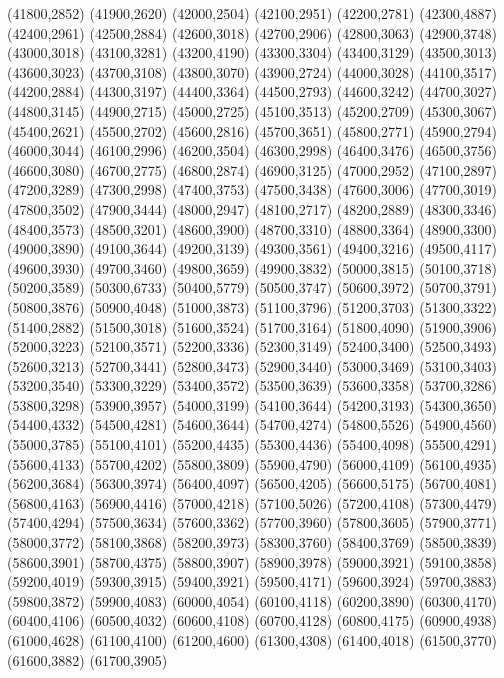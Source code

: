 (41800,2852)
(41900,2620)
(42000,2504)
(42100,2951)
(42200,2781)
(42300,4887)
(42400,2961)
(42500,2884)
(42600,3018)
(42700,2906)
(42800,3063)
(42900,3748)
(43000,3018)
(43100,3281)
(43200,4190)
(43300,3304)
(43400,3129)
(43500,3013)
(43600,3023)
(43700,3108)
(43800,3070)
(43900,2724)
(44000,3028)
(44100,3517)
(44200,2884)
(44300,3197)
(44400,3364)
(44500,2793)
(44600,3242)
(44700,3027)
(44800,3145)
(44900,2715)
(45000,2725)
(45100,3513)
(45200,2709)
(45300,3067)
(45400,2621)
(45500,2702)
(45600,2816)
(45700,3651)
(45800,2771)
(45900,2794)
(46000,3044)
(46100,2996)
(46200,3504)
(46300,2998)
(46400,3476)
(46500,3756)
(46600,3080)
(46700,2775)
(46800,2874)
(46900,3125)
(47000,2952)
(47100,2897)
(47200,3289)
(47300,2998)
(47400,3753)
(47500,3438)
(47600,3006)
(47700,3019)
(47800,3502)
(47900,3444)
(48000,2947)
(48100,2717)
(48200,2889)
(48300,3346)
(48400,3573)
(48500,3201)
(48600,3900)
(48700,3310)
(48800,3364)
(48900,3300)
(49000,3890)
(49100,3644)
(49200,3139)
(49300,3561)
(49400,3216)
(49500,4117)
(49600,3930)
(49700,3460)
(49800,3659)
(49900,3832)
(50000,3815)
(50100,3718)
(50200,3589)
(50300,6733)
(50400,5779)
(50500,3747)
(50600,3972)
(50700,3791)
(50800,3876)
(50900,4048)
(51000,3873)
(51100,3796)
(51200,3703)
(51300,3322)
(51400,2882)
(51500,3018)
(51600,3524)
(51700,3164)
(51800,4090)
(51900,3906)
(52000,3223)
(52100,3571)
(52200,3336)
(52300,3149)
(52400,3400)
(52500,3493)
(52600,3213)
(52700,3441)
(52800,3473)
(52900,3440)
(53000,3469)
(53100,3403)
(53200,3540)
(53300,3229)
(53400,3572)
(53500,3639)
(53600,3358)
(53700,3286)
(53800,3298)
(53900,3957)
(54000,3199)
(54100,3644)
(54200,3193)
(54300,3650)
(54400,4332)
(54500,4281)
(54600,3644)
(54700,4274)
(54800,5526)
(54900,4560)
(55000,3785)
(55100,4101)
(55200,4435)
(55300,4436)
(55400,4098)
(55500,4291)
(55600,4133)
(55700,4202)
(55800,3809)
(55900,4790)
(56000,4109)
(56100,4935)
(56200,3684)
(56300,3974)
(56400,4097)
(56500,4205)
(56600,5175)
(56700,4081)
(56800,4163)
(56900,4416)
(57000,4218)
(57100,5026)
(57200,4108)
(57300,4479)
(57400,4294)
(57500,3634)
(57600,3362)
(57700,3960)
(57800,3605)
(57900,3771)
(58000,3772)
(58100,3868)
(58200,3973)
(58300,3760)
(58400,3769)
(58500,3839)
(58600,3901)
(58700,4375)
(58800,3907)
(58900,3978)
(59000,3921)
(59100,3858)
(59200,4019)
(59300,3915)
(59400,3921)
(59500,4171)
(59600,3924)
(59700,3883)
(59800,3872)
(59900,4083)
(60000,4054)
(60100,4118)
(60200,3890)
(60300,4170)
(60400,4106)
(60500,4032)
(60600,4108)
(60700,4128)
(60800,4175)
(60900,4938)
(61000,4628)
(61100,4100)
(61200,4600)
(61300,4308)
(61400,4018)
(61500,3770)
(61600,3882)
(61700,3905)

